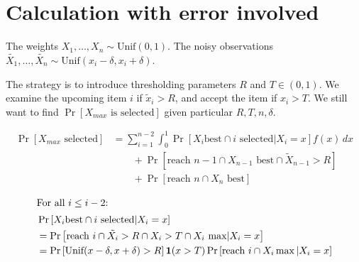 \section{Calculation with error involved}

The weights $X_1, \ldots, X_n \sim \text{Unif}(0,1).$
The noisy observations $\tilde{X_1},\ldots,\tilde{X_n} \sim \text{Unif}(x_i-\delta, x_{i}+\delta).$

The strategy is to introduce thresholding parameters $R$ and $T \in (0,1).$ We examine the upcoming item $i$ if $\tilde{x}_{i}>R$, and accept the item if $x_{i}>T$.
We still want to find $\operatorname{Pr}\left[{X_{max} \text{ is selected}}\right]$ given particular $R,T,n,\delta$.

\begin{equation}
	\begin{split}
	    \operatorname{Pr}\left[{X_{max} \text{ selected}}\right]&=\sum_{i=1}^{n-2} \int_0^1 \operatorname{Pr}\left[{X_i \text{best} \cap i \text{ selected} | X_{i} = x}\right] f(x) \, dx \\
	    &\qquad + \operatorname{Pr}\left[{\text{reach }n-1 \cap X_{n-1} \text{ best} \cap \tilde X_{n-1} > R}\right] \\
	    &\qquad + \operatorname{Pr}\left[{\text{reach }n \cap X_n \text{ best}}\right]
	\end{split}
\end{equation}

\begin{align*}
    \intertext{For all $i\le i-2$:}
	&\operatorname{Pr}\left[{X_i \text{best} \cap i \text{ selected} | X_{i} = x}\right] \\
	&= \operatorname{Pr}\left[{\text{reach }i \cap \tilde{X_{i}}>R \cap X_{i}>T \cap X_i \text{ max} | X_i= x}\right] \\
	&= \operatorname{Pr}\left[{\text{Unif}(x-\delta, x+\delta)>R}\right]\textbf{1}{\left( x>T \right) }\operatorname{Pr}\left[{\text{reach }i \cap X_i \max | X_i = x}\right]
\end{align*}
	
